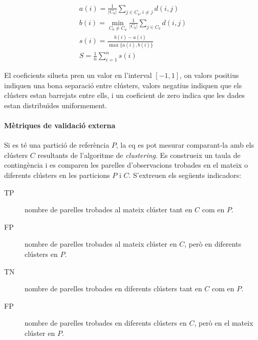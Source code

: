 \documentclass[CAT,BIB]{TFUOC}%
\begin{document}
            \begin{gather}
                a(i) = \frac{1}{|C_a|}
                \sum_{j \in C_a, i \neq j} d(i,j)
                \\
                b(i) = \min_{C_b \neq C_a}
                \frac{1}{|C_b|}
                \sum_{j \in C_b} d(i,j)
                \\
                s(i) = \frac
                {b(i) - a(i)}
                {\max \{a(i), b(i)\}}
                \\
                \label{eq:sil}
                S = \frac{1}{n}
                \sum_{i=1}^{n} s(i)
            \end{gather}

            El coeficients silueta pren un valor en l'interval $[-1, 1]$,
            on valors positius indiquen una bona separació entre clústers,
            valors negatius indiquen que els clústers estan barrejats entre ells,
            i un coeficient de zero indica que les dades estan distribuïdes uniformement.

        \paragraph{Mètriques de validació externa}
            Si es té una partició de referència $P$,
            la \gls{cq} es pot mesurar comparant-la
            amb els clústers $C$ resultants de l'algoritme de \textit{clustering}.
            Es construeix un taula de contingència
            i es comparen les parelles d'observacions
            trobades en el mateix o diferents clústers
            en les particions $P$ i $C$.
            S'extreuen els següents indicadors:
            \begin{description}
                \item[TP]
                nombre de parelles trobades al mateix clúster
                tant en $C$ com en $P$.

                \item[FP] nombre de parelles trobades al mateix clúster en $C$,
                però en diferents clústers en $P$.

                \item[TN] nombre de parelles trobades en diferents clústers
                tant en $C$ com en $P$.

                \item[FP] nombre de parelles trobades en diferents clústers en $C$,
                però en el mateix clúster en $P$.
            \end{description}
\end{document}
